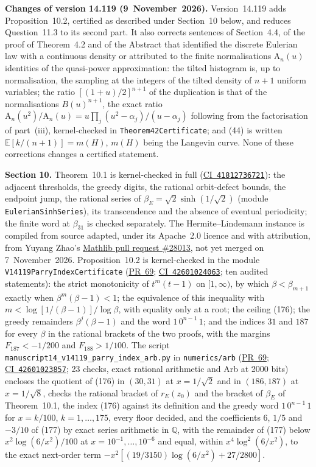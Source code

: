\documentclass[11pt,a4paper]{article}
\newcommand{\R}{https://github.com/ralfanop/Certifications_Eulerian_polar-curve_computations}
\newcommand{\PR}[1]{\href{\R/pull/#1}{PR~#1}}
\newcommand{\CI}[1]{\href{\R/actions/runs/#1}{CI~\texttt{#1}}}
\newcommand{\eq}[1]{(#1)}
\newcommand{\rE}{r_E}
\begin{document}
\textbf{Changes of version 14.119 (9~November~2026).} Version~14.119 adds Proposition~10.2, certified as described under Section~10 below, and reduces Question~11.3 to its second part. It also corrects sentences of Section~4.4, of the proof of Theorem~4.2 and of the Abstract that identified the discrete Eulerian law with a continuous density or attributed to the finite normalisations $\mathrm A_n(u)$ identities of the quasi-power approximation: the tilted histogram is, up to normalisation, the sampling at the integers of the tilted density of $n+1$ uniform variables; the ratio $[(1+u)/2]^{n+1}$ of the duplication is that of the normalisations $B(u)^{n+1}$, the exact ratio $\mathrm A_n(u^2)/\mathrm A_n(u)=u\prod_j(u^2-\alpha_j)/(u-\alpha_j)$ following from the factorisation of part~(iii), kernel-checked in \texttt{Theorem42Certificate}; and \eq{44} is written $\mathbb E[k/(n+1)]=m(H)$, $m(H)$ being the Langevin curve. None of these corrections changes a certified statement.

\textbf{Section 10.} Theorem~10.1 is kernel-checked in full (\CI{41812736721}): the adjacent thresholds, the greedy digits, the rational orbit-defect bounds, the endpoint jump, the rational series of $\beta_E=\sqrt2\sinh(1/\sqrt2)$ (module \texttt{EulerianSinhSeries}), its transcendence and the absence of eventual periodicity; the finite word at $\beta_{31}$ is checked separately. The Hermite--Lindemann instance is compiled from source adapted, under its Apache~2.0 licence and with attribution, from Yuyang Zhao's \href{https://github.com/leanprover-community/mathlib4/pull/28013}{Mathlib pull request \#28013}, not yet merged on 7~November~2026. Proposition~10.2 is kernel-checked in the module \texttt{V14119ParryIndexCertificate} (\PR{69}; \CI{42601024063}; ten audited statements): the strict monotonicity of $t^m(t-1)$ on $[1,\infty)$, by which $\beta<\beta_{m+1}$ exactly when $\beta^m(\beta-1)<1$; the equivalence of this inequality with $m<\log[1/(\beta-1)]/\log\beta$, with equality only at a root; the ceiling \eq{176}; the greedy remainders $\beta^j(\beta-1)$ and the word $1\,0^{n-1}\,1$; and the indices $31$ and $187$ for every $\beta$ in the rational brackets of the two proofs, with the margins $F_{187}<-1/200$ and $F_{188}>1/100$. The script \texttt{manuscript14\_\allowbreak v14119\_\allowbreak parry\_\allowbreak index\_\allowbreak arb.py} in \texttt{numerics/\allowbreak arb} (\PR{69}; \CI{42601023857}; 23 checks, exact rational arithmetic and Arb at 2000 bits) encloses the quotient of \eq{176} in $(30,31)$ at $x=1/\sqrt2$ and in $(186,187)$ at $x=1/\sqrt8$, checks the rational bracket of $\rE(z_0)$ and the bracket of $\beta_E$ of Theorem~10.1, the index \eq{176} against its definition and the greedy word $1\,0^{n-1}\,1$ for $x=k/100$, $k=1,\ldots,175$, every floor decided, and the coefficients $6$, $1/5$ and $-3/10$ of \eq{177} by exact series arithmetic in $\mathbb Q$, with the remainder of \eq{177} below $x^2\log(6/x^2)/100$ at $x=10^{-1},\ldots,10^{-6}$ and equal, within $x^4\log^2(6/x^2)$, to the exact next-order term $-x^2[(19/3150)\log(6/x^2)+27/2800]$.
\end{document}
